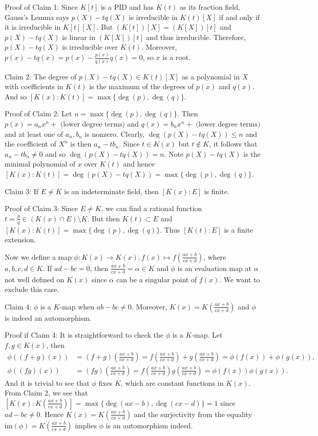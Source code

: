 \documentclass[12pt,a4paper]{article}
\def\im{\text{im}}
\def\aa{\alpha}
\begin{document}
Proof of Claim 1: Since $K[t]$ is a PID and has $K(t)$ as its fraction field, Gauss's Lemma says $p(X)-tq(X)$ is irreducible in $K(t)[X]$ if and only if it is irreducible in $K[t][X]$. But $(K[t])[X]=(K[X])[t]$ and $p(X)-tq(X)$ is linear in $(K[X])[t]$ and thus irreducible. Therefore,  $p(X)-tq(X)$ is irreducible over $K(t)$. Moreover, $p(x)-tq(x) =  p(x)-\frac{p(x)}{q(x)}q(x)=0$, so $x$ is a root.



\bigskip
Claim 2:  The degree of $p(X)-tq(X)\in K(t)[X]$ as a polynomial in $X$ with coefficients in $K(t)$ is the maximum of the degrees of $p(x)$ and $q(x)$. And so $[K(x):K(t)]=\max\{\deg(p),\deg(q)\}$.


Proof of Claim 2: Let $n=\max\{\deg(p),\deg(q)\}$. Then $p(x)=a_nx^n+\mbox{ (lower degree terms)}$ and $q(x)=b_nx^n+\mbox{ (lower degree terms)}$ and at least one of $a_n,b_n$ is nonzero. Clearly, $\deg(p(X)-tq(X))\leq n$ and the coefficient of $X^n$ is then $a_n-tb_n$. Since $t\in K(x)$ but $t\notin K$, it follows that $a_n-tb_n\not=0$ and so $\deg(p(X)-tq(X))=n$. Note $p(X)-tq(X)$ is the minimal polynomial of $x$ over $K(t)$ and hence $[K(x):K(t)]=\deg(p(X)-tq(X))=\max\{\deg(p),\deg(q)\}$.


\bigskip
Claim 3: If $E\not=K$ is an indeterminate field, then $[K(x):E]$ is finite.


Proof of Claim 3: Since $E\not=K$, we can find a rational function $t=\frac{p}{q}\in (K(x)\cap E) \setminus K$. But then $K(t)\subset E$ and $[K(x):K(t)]= \max\{\deg(p),\deg(q)\}$. Thus $[K(t):E]$ is a finite extension.



\bigskip
Now we define a map $\phi: K(x)\to K(x), f(x)\mapsto f(\frac{ax+b}{cx+d})$, where $a,b,c,d\in K$. If $ad-bc=0$, then $\frac{ax+b}{cx+d}=\aa\in K$ and $\phi$ is an evaluation map at $\aa$ not well defined on $K(x)$ since $\aa$ can be a singular point of $f(x)$. We want to exclude this case.

Claim 4: $\phi$ is a $K$-map when $ab-bc\not=0$. Moreover, $K(x)=K(\frac{ax+b}{cx+d})$ and $\phi$ is indeed an automorphism.


Proof if Claim 4: It is straightforward to check the $\phi$ is a $K$-map. Let $f,g\in K(x)$, then \begin{align*}
    \phi((f+g)(x))&=(f+g)(\frac{ax+b}{cx+d})=f(\frac{ax+b}{cx+d})+g(\frac{ax+b}{cx+d})=\phi(f(x))+\phi(g(x)),\\
    \phi((fg)(x))&=(fg)(\frac{ax+b}{cx+d})=f(\frac{ax+b}{cx+d})g(\frac{ax+b}{cx+d})=\phi(f(x))\phi(g(x)).
\end{align*}
And it is trivial to see that $\phi$ fixes $K$, which are constant functions in $K(x)$. From Claim 2, we see that $[K(x):K(\frac{ax+b}{cx+d})]=\max\{\deg(ax-b),\deg(cx-d)\} = 1$ since $ad-bc\not=0$. Hence $K(x)=K(\frac{ax+b}{cx+d})$ and the surjectivity from the equality $\im(\phi)=K(\frac{ax+b}{cx+d})$ implies $\phi$ is an automorphism indeed.
\end{document}

